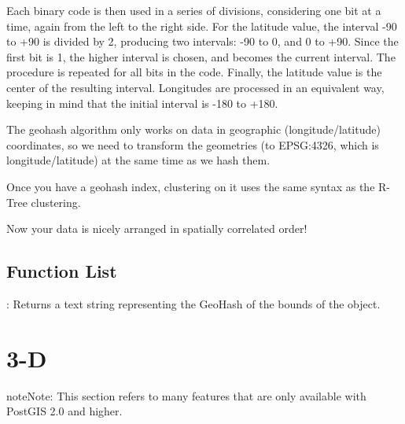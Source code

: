 \documentclass[a4paper,11pt,english]{sphinxmanual}
\begin{document}
Each binary code is then used in a series of divisions, considering one bit at a time, again from the left to the right side. For the latitude value, the interval -90 to +90 is divided by 2, producing two intervals: -90 to 0, and 0 to +90. Since the first bit is 1, the higher interval is chosen, and becomes the current interval. The procedure is repeated for all bits in the code. Finally, the latitude value is the center of the resulting interval. Longitudes are processed in an equivalent way, keeping in mind that the initial interval is -180 to +180.

The geohash algorithm only works on data in geographic (longitude/latitude) coordinates, so we need to transform the geometries (to EPSG:4326, which is longitude/latitude) at the same time as we hash them.

\begin{sphinxVerbatim}[commandchars=\\\{\}]
     
\end{sphinxVerbatim}

Once you have a geohash index, clustering on it uses the same syntax as the R-Tree clustering.

\begin{sphinxVerbatim}[commandchars=\\\{\}]
   
\end{sphinxVerbatim}

Now your data is nicely arranged in spatially correlated order!


\subsection{Function List}
\label{\detokenize{advanced:id8}}
: Returns a text string representing the GeoHash of the bounds of the object.


\section{3-D}
\label{\detokenize{advanced:d}}\label{\detokenize{advanced:id9}}
\begin{sphinxadmonition}{note}{Note:}
This section refers to many features that are only available with PostGIS 2.0 and higher.
\end{sphinxadmonition}
\end{document}
